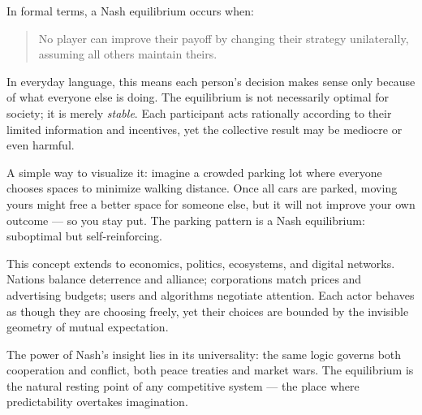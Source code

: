 \documentclass[12pt,twoside]{book}
\begin{document}
In formal terms, a Nash equilibrium occurs when:
\begin{quote}
No player can improve their payoff by changing their strategy unilaterally, assuming all others maintain theirs.
\end{quote}

In everyday language, this means each person’s decision makes sense only because of what everyone else is doing.  
The equilibrium is not necessarily optimal for society; it is merely \emph{stable}.  
Each participant acts rationally according to their limited information and incentives, yet the collective result may be mediocre or even harmful.  

A simple way to visualize it: imagine a crowded parking lot where everyone chooses spaces to minimize walking distance.  
Once all cars are parked, moving yours might free a better space for someone else, but it will not improve your own outcome — so you stay put.  
The parking pattern is a Nash equilibrium: suboptimal but self-reinforcing.  

This concept extends to economics, politics, ecosystems, and digital networks.  
Nations balance deterrence and alliance; corporations match prices and advertising budgets; users and algorithms negotiate attention.  
Each actor behaves as though they are choosing freely, yet their choices are bounded by the invisible geometry of mutual expectation.  

The power of Nash’s insight lies in its universality: the same logic governs both cooperation and conflict, both peace treaties and market wars.  
The equilibrium is the natural resting point of any competitive system — the place where predictability overtakes imagination.
\end{document}
